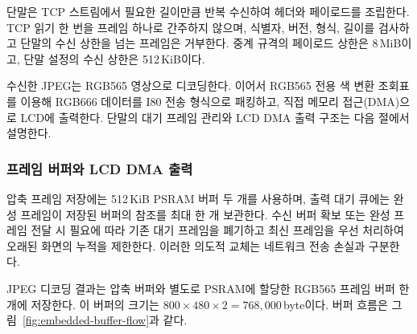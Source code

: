 \documentclass[11pt,a4paper]{article}
\begin{document}
단말은 TCP 스트림에서 필요한 길이만큼 반복 수신하여 헤더와 페이로드를 조립한다. TCP 읽기 한 번을
프레임 하나로 간주하지 않으며, 식별자, 버전, 형식, 길이를 검사하고 단말의 수신 상한을 넘는 프레임은
거부한다. 중계 규격의 페이로드 상한은 8\,MiB이고, 단말 설정의 수신 상한은 512\,KiB이다.

수신한 JPEG는 RGB565 영상으로 디코딩한다. 이어서 RGB565 전용 색 변환 조회표를 이용해
RGB666 데이터를 I80 전송 형식으로 패킹하고, 직접 메모리 접근(DMA)으로 LCD에 출력한다.
단말의 대기 프레임 관리와 LCD DMA 출력 구조는 다음 절에서 설명한다.

\subsubsection{프레임 버퍼와 LCD DMA 출력}

압축 프레임 저장에는 512\,KiB PSRAM 버퍼 두 개를 사용하며, 출력 대기 큐에는 완성 프레임이 저장된
버퍼의 참조를 최대 한 개 보관한다. 수신 버퍼 확보 또는 완성 프레임 전달 시 필요에 따라 기존 대기
프레임을 폐기하고 최신 프레임을 우선 처리하여 오래된 화면의 누적을 제한한다. 이러한 의도적 교체는
네트워크 전송 손실과 구분한다.

JPEG 디코딩 결과는 압축 버퍼와 별도로 PSRAM에 할당한 RGB565 프레임 버퍼 한 개에 저장한다.
이 버퍼의 크기는 $800\times480\times2=768{,}000$\,byte이다.
버퍼 흐름은 그림~\ref{fig:embedded-buffer-flow}과 같다.
\end{document}
